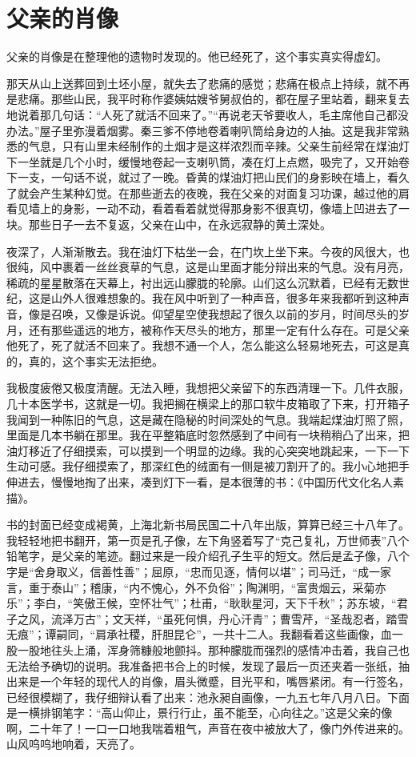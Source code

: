 \documentclass[12pt,oneside]{book}
\begin{document}
\chapter{父亲的肖像}
父亲的肖像是在整理他的遗物时发现的。他已经死了，这个事实真实得虚幻。

那天从山上送葬回到土坯小屋，就失去了悲痛的感觉；悲痛在极点上持续，就不再是悲痛。那些山民，我平时称作婆姨姑嫂爷舅叔伯的，都在屋子里站着，翻来复去地说着那几句话：``人死了就活不回来了。''``再说老天爷要收人，毛主席他自己都没办法。''屋子里弥漫着烟雾。秦三爹不停地卷着喇叭筒给身边的人抽。这是我非常熟悉的气息，只有山里未经制作的土烟才是这样浓烈而辛辣。父亲生前经常在煤油灯下一坐就是几个小时，缓慢地卷起一支喇叭筒，凑在灯上点燃，吸完了，又开始卷下一支，一句话不说，就过了一晚。昏黄的煤油灯把山民们的身影映在墙上，看久了就会产生某种幻觉。在那些逝去的夜晚，我在父亲的对面复习功课，越过他的肩看见墙上的身影，一动不动，看着看着就觉得那身影不很真切，像墙上凹进去了一块。那些日子一去不复返，父亲在山中，在永远寂静的黄土深处。

夜深了，人渐渐散去。我在油灯下枯坐一会，在门坎上坐下来。今夜的风很大，也很纯，风中裹着一丝丝衰草的气息，这是山里面才能分辩出来的气息。没有月亮，稀疏的星星散落在天幕上，衬出远山朦胧的轮廓。山们这么沉默着，已经有无数世纪，这是山外人很难想象的。我在风中听到了一种声音，很多年来我都听到这种声音，像是召唤，又像是诉说。仰望星空使我想起了很久以前的岁月，时间尽头的岁月，还有那些遥远的地方，被称作天尽头的地方，那里一定有什么存在。可是父亲他死了，死了就活不回来了。我想不通一个人，怎么能这么轻易地死去，可这是真的，真的，这个事实无法拒绝。

我极度疲倦又极度清醒。无法入睡，我想把父亲留下的东西清理一下。几件衣服，几十本医学书，这就是一切。我把搁在横梁上的那口软牛皮箱取了下来，打开箱子我闻到一种陈旧的气息，这是藏在隐秘的时间深处的气息。我端起煤油灯照了照，里面是几本书躺在那里。我在平整箱底时忽然感到了中间有一块稍稍凸了出来，把油灯移近了仔细摸索，可以摸到一个明显的边缘。我的心突突地跳起来，一下一下生动可感。我仔细摸索了，那深红色的绒面有一侧是被刀割开了的。我小心地把手伸进去，慢慢地掏了出来，凑到灯下一看，是本很薄的书：《中国历代文化名人素描》。

书的封面已经变成褐黄，上海北新书局民国二十八年出版，算算已经三十八年了。我轻轻地把书翻开，第一页是孔子像，左下角竖着写了``克己复礼，万世师表''八个铅笔字，是父亲的笔迹。翻过来是一段介绍孔子生平的短文。然后是孟子像，八个字是``舍身取义，信善性善''；屈原，``忠而见逐，情何以堪''；司马迁，``成一家言，重于泰山''；稽康，``内不愧心，外不负俗''；陶渊明，``富贵烟云，采菊亦乐''；李白，``笑傲王候，空怀壮气''；杜甫，``耿耿星河，天下千秋''；苏东坡，``君子之风，流泽万古''；文天祥，``虽死何惧，丹心汗青''；曹雪芹，``圣哉忍者，踏雪无痕''；谭嗣同，``肩承社稷，肝胆昆仑''，一共十二人。我翻看着这些画像，血一股一股地往头上涌，浑身筛糠般地颤抖。那种朦胧而强烈的感情冲击着，我自己也无法给予确切的说明。我准备把书合上的时候，发现了最后一页还夹着一张纸，抽出来是一个年轻的现代人的肖像，眉头微蹙，目光平和，嘴唇紧闭。有一行签名，已经很模糊了，我仔细辩认看了出来：池永昶自画像，一九五七年八月八日。下面是一横排钢笔字：``高山仰止，景行行止，虽不能至，心向往之。''这是父亲的像啊，二十年了！一口一口地我喘着粗气，声音在夜中被放大了，像门外传进来的。山风呜呜地响着，天亮了。
\end{document}

